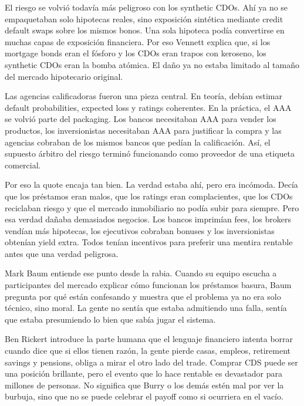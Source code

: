 El riesgo se volvió todavía más peligroso con los synthetic CDOs. Ahí ya no se empaquetaban solo hipotecas reales, sino exposición sintética mediante credit default swaps sobre los mismos bonos. Una sola hipoteca podía convertirse en muchas capas de exposición financiera. Por eso Vennett explica que, si los mortgage bonds eran el fósforo y los CDOs eran trapos con keroseno, los synthetic CDOs eran la bomba atómica. El daño ya no estaba limitado al tamaño del mercado hipotecario original.

Las agencias calificadoras fueron una pieza central. En teoría, debían estimar default probabilities, expected loss y ratings coherentes. En la práctica, el AAA se volvió parte del packaging. Los bancos necesitaban AAA para vender los productos, los inversionistas necesitaban AAA para justificar la compra y las agencias cobraban de los mismos bancos que pedían la calificación. Así, el supuesto árbitro del riesgo terminó funcionando como proveedor de una etiqueta comercial.

Por eso la quote  encaja tan bien. La verdad estaba ahí, pero era incómoda. Decía que los préstamos eran malos, que los ratings eran complacientes, que los CDOs reciclaban riesgo y que el mercado inmobiliario no podía subir para siempre. Pero esa verdad dañaba demasiados negocios. Los bancos imprimían fees, los brokers vendían más hipotecas, los ejecutivos cobraban bonuses y los inversionistas obtenían yield extra. Todos tenían incentivos para preferir una mentira rentable antes que una verdad peligrosa.

Mark Baum entiende ese punto desde la rabia. Cuando su equipo escucha a participantes del mercado explicar cómo funcionan los préstamos basura, Baum pregunta por qué están confesando y  muestra que el problema ya no era solo técnico, sino moral. La gente no sentía que estaba admitiendo una falla, sentía que estaba presumiendo lo bien que sabía jugar el sistema.

Ben Rickert introduce la parte humana que el lenguaje financiero intenta borrar cuando dice que si ellos tienen razón, la gente pierde casas, empleos, retirement savings y pensions, obliga a mirar el otro lado del trade. Comprar CDS puede ser una posición brillante, pero el evento que lo hace rentable es devastador para millones de personas. No significa que Burry o los demás estén mal por ver la burbuja, sino que no se puede celebrar el payoff como si ocurriera en el vacío.

